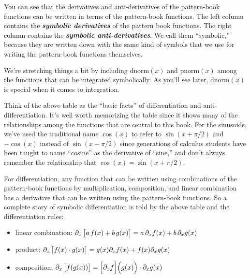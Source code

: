 \documentclass[
  letterpaper,
  DIV=11,
  numbers=noendperiod,
  oneside]{scrreprt}
\newcommand{\pnorm}{\text{pnorm}}
\newcommand{\dnorm}{\text{dnorm}}
\begin{document}
You can see that the derivatives and anti-derivatives of the
pattern-book functions can be written in terms of the pattern-book
functions. The left column contains the \textbf{\emph{symbolic
derivatives}} of the pattern book functions. The right column contains the
\textbf{\emph{symbolic anti-derivatives}}. We call them ``symbolic,''
because they are written down with the same kind of symbols that we use
for writing the pattern-book functions themselves.

We're stretching things a bit by including \(\dnorm(x)\) and
\(\pnorm(x)\) among the functions that can be integrated symbolically.
As you'll see later, \(\dnorm(x)\) is special when it comes to
integration.

Think of the above table as the ``basic facts'' of differentiation and
anti-differentiation. It's well worth memorizing the table since it
shows many of the relationships among the functions that are central to
this book. For the sinusoids, we've used the traditional name
\(\cos(x)\) to refer to \(\sin(x + \pi/2)\) and \(-\cos(x)\) instead of
\(\sin(x - \pi/2)\) since generations of calculus students have been
taught to name ``cosine'' as the derivative of ``sine,'' and don't
always remember the relationship that \(\cos(x) =\sin(x + \pi/2)\).

For differentiation, any function that can be written using combinations
of the pattern-book functions by multiplication, composition, and linear
combination has a derivative that can be written using the pattern-book
functions. So a complete story of symbolic differentiation is told by
the above table and the differentiation rules:

\begin{itemize}
\item
  linear combination:
  \(\partial_x \left[{\strut}a\, f(x) + b\, g(x)\right] = a\, \partial_x f(x) + b\, \partial_x g(x)\)
\item
  product:
  \(\partial_x \left[{\strut}f(x)\cdot g(x)\right] = g(x) \partial_x f(x) + f(x) \partial_x g(x)\)
\item
  composition:
  \(\partial_x \left[{\strut}f(g(x))\right] = \left[\partial_x f{\large\strut}\right]\!\left({\large\strut}g(x)\right) \cdot \partial_x g(x)\)
\end{itemize}
\end{document}
